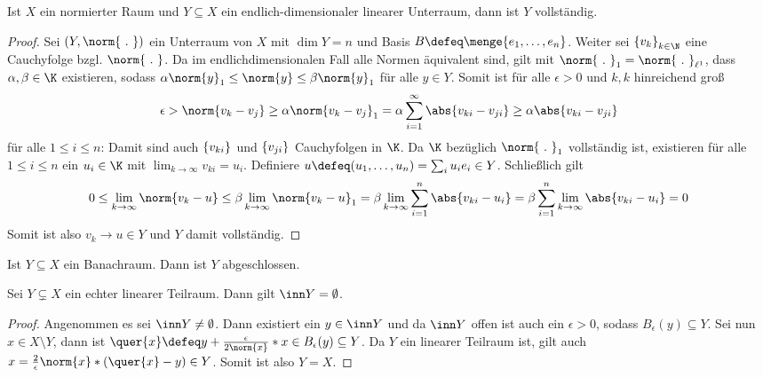 \begin{exercisePage}
	
	\setcounter{taskcount}{28}
	
	\begin{lemma} \label{lemma: 10_1}
		Ist $X$ ein normierter Raum und $Y \subseteq X$ ein endlich-dimensionaler linearer Unterraum, dann ist $Y$ vollständig.
	\end{lemma}
	\begin{proof}
		Sei $(Y, \norm{\ .\ })$ ein Unterraum von $X$ mit $\dim Y = n$ und Basis $B \defeq \menge{e_1, \dots, e_n}$. Weiter sei $\folge{v_k}{k \in \N}$ eine Cauchyfolge bzgl. $\norm{\ . \ }$. Da im endlichdimensionalen Fall alle Normen äquivalent sind, gilt mit $\norm{\ . \ }_1 = \norm{\ . \ }_{\ell^1}$, dass $\alpha, \beta \in \K$ existieren, sodass $\alpha \norm{y}_1 \le \norm{y} \le \beta \norm{y}_1$ für alle $y \in Y$. Somit ist für alle $\epsilon > 0$ und $k,k$ hinreichend groß 
		\begin{equation*}
			\epsilon > \norm{v_k - v_j} \ge \alpha \norm{v_k - v_j}_1 = \alpha \sum_{i=1}^\infty \abs{v_{ki} - v_{ji}} \ge \alpha \abs{v_{ki} - v_{ji}}
		\end{equation*} 
		für alle $1 \le i \le n$: Damit sind auch $\left\{ v_{ki} \right\}_{}$ und $\left\{ v_{ji} \right\}_{}$ Cauchyfolgen in $\K$. Da $\K$ bezüglich $\norm{\ . \ }_1$ vollständig ist, existieren für alle $1 \le i \le n$ ein $u_i \in \K$ mit $\lim_{k \to \infty} v_{ki} = u_i$. Definiere $u \defeq (u_1, \dots, u_n) = \sum_i u_i e_i \in Y$. Schließlich gilt
		\begin{equation*}
			\begin{aligned}
			0 
			\le \lim_{k \to \infty} \norm{v_k - u} 
			\le \beta \lim_{k \to \infty} \norm{v_k - u}_1 
			= \beta \lim_{k \to \infty} \sum_{i=1}^n \abs{v_{ki} - u_i} 
			= \beta \sum_{i=1}^n \lim_{k \to \infty} \abs{v_{ki} - u_i} 
			= 0
			\end{aligned}
		\end{equation*}
		Somit ist also $v_k \to u \in Y$ und $Y$ damit vollständig.
 	\end{proof}

	\begin{lemma} \label{lemma: 10_2}
		Ist $Y \subseteq X$ ein Banachraum. Dann ist $Y$ abgeschlossen.
	\end{lemma}

	\begin{lemma} \label{lemma: 10_3}
		Sei $Y \subsetneq X$ ein echter linearer Teilraum. Dann gilt $\inn Y = \emptyset$.
	\end{lemma}
	\begin{proof}
		Angenommen es sei $\inn Y \neq \emptyset$. Dann existiert ein $y \in \inn Y$ und da $\inn Y$ offen ist auch ein $\epsilon > 0$, sodass $B_\epsilon(y) \subseteq Y$. Sei nun $x \in X \setminus Y$, dann ist $\quer{x} \defeq y + \frac{\epsilon}{2 \norm{x}}  * x \in B_\epsilon(y) \subseteq Y$. Da $Y$ ein linearer Teilraum ist, gilt auch $x = \frac{2}{\epsilon} \norm{x} * (\quer{x} - y) \in Y$. Somit ist also $Y = X$.
	\end{proof}


\end{exercisePage}
